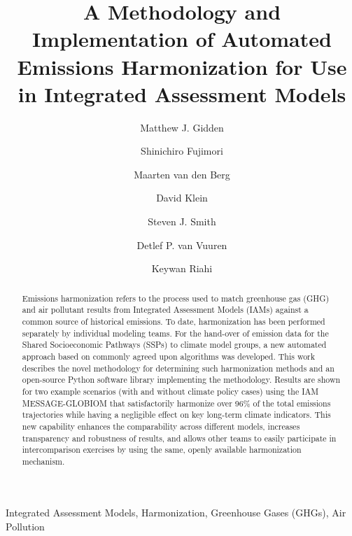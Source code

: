 \documentclass[review]{elsarticle}
\begin{document}
\begin{frontmatter}

\title{A Methodology and Implementation of Automated Emissions Harmonization for Use in Integrated Assessment Models}

\author[iiasa]{Matthew J. Gidden}

\author[nies]{Shinichiro Fujimori}
\author[pbl]{Maarten van den Berg}
\author[pik]{David Klein}
\author[pnnl]{Steven J. Smith}
\author[pbl]{Detlef P. van Vuuren}
\author[iiasa]{Keywan Riahi}

\address[iiasa]{International Institute for Applied Systems Analysis,
  Schlossplatz 1, A-2361 Laxenburg, Austria}
\address[nies]{Center for Social and Environmental Systems Research, National Institute for Environmental Studies, 16-2 Onogawa, Tsukuba, Ibaraki 305-8506, Japan}
\address[pbl]{PBL Netherlands Environmental Assessment Agency, Postbus 30314, 2500 GH The Hague, Netherlands}
\address[pik]{Potsdam Institute for Climate Impact Research (PIK), Member of the Leibniz Association, P.O. Box 60 12 03, D-14412 Potsdam, Germany}
\address[pnnl]{Joint Global Change Research Institute, 5825 University Research Court, Suite 3500, College Park, MD 20740}

\begin{abstract}
Emissions harmonization refers to the process used to match greenhouse gas (GHG)
and air pollutant results from Integrated Assessment Models (IAMs) against a
common source of historical emissions. To date, harmonization has been performed
separately by individual modeling teams. For the hand-over of emission data for
the Shared Socioeconomic Pathways (SSPs) to climate model groups, a new
automated approach based on commonly agreed upon algorithms was developed. This
work describes the novel methodology for determining such harmonization methods
and an open-source Python software library implementing the methodology. Results
are shown for two example scenarios (with and without climate policy cases)
using the IAM MESSAGE-GLOBIOM that satisfactorily harmonize over 96\% of the
total emissions trajectories while having a negligible effect on key long-term
climate indicators. This new capability enhances the comparability across
different models, increases transparency and robustness of results, and allows
other teams to easily participate in intercomparison exercises by using the
same, openly available harmonization mechanism.
\end{abstract}

\begin{keyword}
Integrated Assessment Models, Harmonization, Greenhouse Gases (GHGs), Air Pollution 
\end{keyword}

\end{frontmatter}
\end{document}
